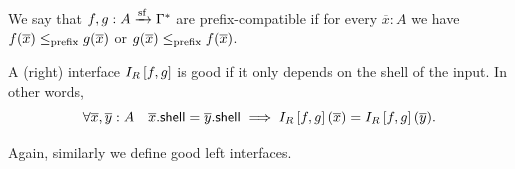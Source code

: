 \begin{definition}
    We say that $f, g: A \xrightarrow{\mathrm{sf}} \Gamma^*$ are prefix-compatible if for every $\overline x : A$ we have $f(\overline x) \leq_{\mathrm{prefix}} g(\overline x)$ or $g(\overline x) \leq_{\mathrm{prefix}} f(\overline x)$.
\end{definition}


\begin{definition}
    A (right) interface $I_R \left[ f, g \right]$ is good if it only depends on the shell of the input. In other words,
    \[
        \forall \overline x, \overline y : A \quad \overline x . \mathsf{shell} = \overline y . \mathsf{shell} \implies I_R \left[ f, g \right](\overline x) = I_R \left[ f, g \right](\overline y).
    \]
\end{definition}

Again, similarly we define good left interfaces.